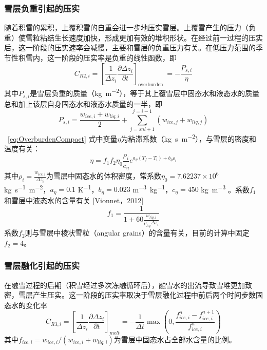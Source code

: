 \subsubsection{雪层负重引起的压实}
随着积雪的累积，上覆积雪的自重会进一步地压实雪层。上覆雪产生的压力（负重）使雪粒粘结生长速度加快，形成更加有效的堆积形状。在经过前一过程的压实后，这一阶段的压实速率会减慢，主要和雪层的负重压力有关。在低压力范围的季节性积雪内，这一阶段的压实率是负重的线性函数\citep{anderson1976point}，即
\begin{equation}\label{eq:OverburdenCompact}
C_{R2,i}=\left[\frac{1}{\Delta {z_i}} \frac{\partial \Delta {z_i}}{\partial {t}}\right]_{\text {overburden }}=-\frac{P_{s,i}}{\eta}
\end{equation}
其中$P_{s,i}$是雪层负重的质量（\unit{kg.m^{-2}}），等于其上覆雪层中固态水和液态水的质量总和加上该层自身固态水和液态水质量的一半，即
\begin{equation}
P_{s,i}=\frac{w_{ice,i}+w_{liq,i}}{2}+\sum_{{j}={snl}+1}^{{j}={i}-1}\left({w}_{ice,j}+{w}_{liq,j}\right)
\end{equation}
~\eqref{eq:OverburdenCompact} 式中变量$\eta$为粘滞系数（\unit{kg.s.m^{-2}}），与雪层的密度和温度有关：
\begin{equation}
    \eta=f_1 f_2 \eta_0 \frac{\rho_i}{c_\eta} e^{a_\eta \left(T_f-T_i\right)+b_\eta \rho_i}
\end{equation}
其中$\rho_i=\frac{w_{ice,i}}{\Delta z_i}$为雪层中固态水的体积密度，常系数$\eta_0=7.62237 \times 10^6$ \unit{kg.s^{-1}.m^{-2}}，$a_\eta=0.1$ \unit{K^{-1}}，$b_\eta=0.023$ \unit{m^{-3}.kg^{-1}}，$c_\eta=450$ \unit{kg.m^{-3}} \citep{Kampenhout2017}。系数$f_1$和雪层中液态水的含量有关 [Vionnet，2012]
\begin{equation}
    f_1=\frac{1}{1+60\frac{w_{liq,i}}{\rho_{liq}\Delta z_i}}
\end{equation}
系数$f_2$则与雪层中棱状雪粒（angular grains）的含量有关，目前的计算中固定$f_2=4$。

\subsubsection{雪层融化引起的压实}
在融雪过程的后期（积雪经过多次冻融循环后），融雪水的出流导致雪堆更加致密，雪层产生压实。这一阶段的压实率取决于雪层融化过程中前后两个时间步数固态水的变化率
\begin{equation}
C_{R3,i}=\left[\frac{1}{\Delta {z_i}} \frac{\partial \Delta {z_i}}{\partial {t}}\right]_{melt}=-\frac{1}{\Delta {t}}\max\left(0,\frac{{f}_{{ice,i}}^{n}-{f}_{{ice,i}}^{n+1}}{{f}_{ice,i}^{n}}\right)
\end{equation}
其中$f_{ice,i}=w_{ice,i}/\left({w_{ice,i}+w_{liq,i}}\right)$为雪层中固态水占全部水含量的比例。

